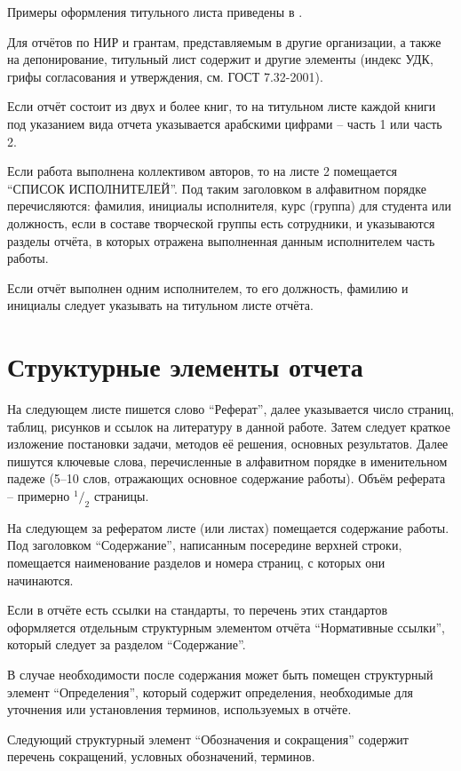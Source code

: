 \documentclass[utf8,12pt, coursreport]{G7-32}
\begin{document}
Примеры оформления титульного листа приведены в \cite{dferules}.

Для отчётов по НИР и грантам, представляемым в другие организации, а также на депонирование, титульный лист содержит и другие элементы (индекс УДК, грифы согласования и утверждения, см. ГОСТ 7.32-2001).

Если отчёт состоит из двух и более книг, то на титульном листе каждой книги под указанием вида отчета указывается арабскими цифрами -- часть 1 или часть 2.

Если работа выполнена коллективом авторов, то на листе 2 помещается ``СПИСОК ИСПОЛНИТЕЛЕЙ''. Под таким заголовком в алфавитном порядке перечисляются: фамилия, инициалы исполнителя, курс (группа) для студента или должность, если в составе творческой группы есть сотрудники, и указываются разделы отчёта, в которых отражена выполненная данным исполнителем часть работы.

Если отчёт выполнен одним исполнителем, то его должность, фамилию и инициалы следует указывать на титульном листе отчёта.

\section{Структурные элементы отчета}

На следующем листе пишется слово ``Реферат'', далее указывается число страниц, таблиц, рисунков и ссылок на литературу в данной работе. Затем следует краткое изложение постановки задачи, методов её решения, основных результатов. Далее пишутся ключевые слова, перечисленные в алфавитном порядке в именительном падеже (5--10 слов, отражающих основное содержание работы). Объём реферата -- примерно $^1/_2$ страницы.

На следующем за рефератом листе (или листах) помещается содержание работы. Под заголовком ``Содержание'', написанным посередине верхней строки, помещается наименование разделов и номера страниц, с которых они начинаются.

Если в отчёте есть ссылки на стандарты, то перечень этих стандартов оформляется отдельным структурным элементом отчёта ``Нормативные ссылки'', который следует за разделом ``Содержание''.

В случае необходимости после содержания может быть помещен структурный элемент ``Определения'', который содержит определения, необходимые для уточнения или установления терминов, используемых в отчёте.

Следующий структурный элемент ``Обозначения и сокращения'' содержит перечень сокращений, условных обозначений, терминов.
\end{document}

